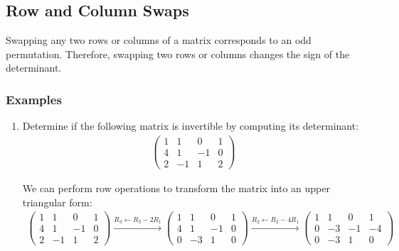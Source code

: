 \documentclass{article}
\begin{document}
\subsection{Row and Column Swaps}

Swapping any two rows or columns of a matrix corresponds to an odd permutation. Therefore, swapping two rows or columns changes the sign of the determinant.
% 

\subsubsection*{Examples}
\begin{enumerate}
    \item Determine if the following matrix is invertible by computing its determinant:
          \begin{align*}
              \begin{pmatrix}
                  1 & 1  & 0  & 1 \\
                  4 & 1  & -1 & 0 \\
                  2 & -1 & 1  & 2
              \end{pmatrix}
          \end{align*}

          We can perform row operations to transform the matrix into an upper triangular form:
          \begin{align*}
              \begin{pmatrix}
                  1 & 1  & 0  & 1 \\
                  4 & 1  & -1 & 0 \\
                  2 & -1 & 1  & 2
              \end{pmatrix}
              \xrightarrow{R_3 \leftarrow R_3 - 2R_1}
              \begin{pmatrix}
                  1 & 1  & 0  & 1 \\
                  4 & 1  & -1 & 0 \\
                  0 & -3 & 1  & 0
              \end{pmatrix}
              \xrightarrow{R_2 \leftarrow R_2 - 4R_1}
              \begin{pmatrix}
                  1 & 1  & 0  & 1  \\
                  0 & -3 & -1 & -4 \\
                  0 & -3 & 1  & 0
              \end{pmatrix}
          \end{align*}


\end{enumerate}
\end{document}
